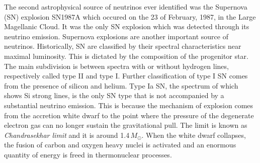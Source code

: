 \begin{figure}
	\centering
\end{figure}


The second astrophysical source of neutrinos ever identified was the Supernova (SN) explosion SN1987A %
which occured on the 23 of February, 1987, in the Large Magellanic Cloud.
It was the only SN explosion which was detected through its neutrino emission.
Supernova explosions are another important source of neutrinos.
Historically, SN are classified by their spectral characteristics near maximal luminosity.
This is dictated by the composition of the progenitor star.
The main subdivision is between spectra with or without hydrogen lines, respectively called %
type II and type I.
Further classification of type I SN comes from the presence of silicon and helium.
Type Ia SN, the spectrum of which shows Si strong lines, is the only SN type that is not accompanied %
by a substantial neutrino emission.
This is because the mechanism of explosion comes from the accretion white dwarf to the point where %
the pressure of the degenerate electron gas can no longer sustain the gravitational pull.
The limit is known as \emph{Chandrasekhar limit} and it is around 1.4\,$M_\odot$.
When the white dwarf collapses, the fusion of carbon and oxygen heavy nuclei is activated %
and an enormous quantity of energy is freed in thermonuclear processes.

